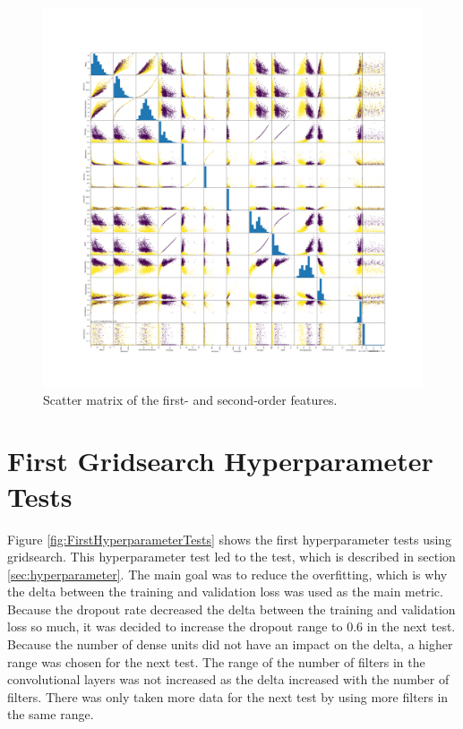 \begin{figure}
    \centering
    \includegraphics[width=1.2\textwidth]{plots/scatter_matrix.png}
    \caption{Scatter matrix of the first- and second-order features.}
    \label{fig:scatter_matrix}
\end{figure}


\section{First Gridsearch Hyperparameter Tests}
\label{sec:FirstGridsearchHyperparameterTests}

Figure \ref{fig:FirstHyperparameterTests} shows the first hyperparameter tests using gridsearch.
This hyperparameter test led to the test, which is described in section \ref{sec:hyperparameter}.
The main goal was to reduce the overfitting, which is why the delta between the training and validation loss was used as the main metric. 
Because the dropout rate decreased the delta between the training and validation loss so much, it was decided to increase the dropout range to 0.6 in the next test.
Because the number of dense units did not have an impact on the delta, a higher range was chosen for the next test.
The range of the number of filters in the convolutional layers was not increased as the delta increased with the number of filters.
There was only taken more data for the next test by using more filters in the same range.


